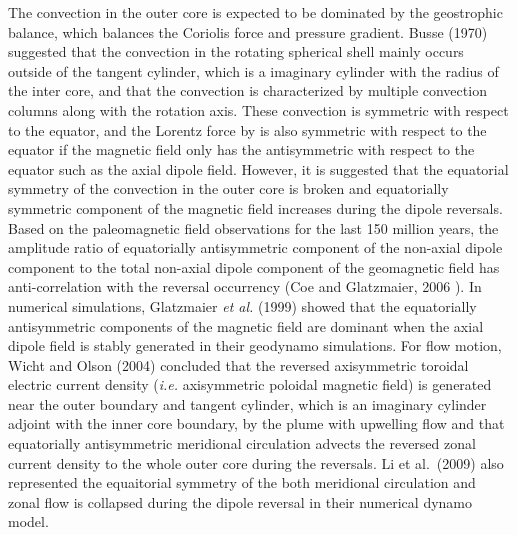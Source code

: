 The convection in the outer core is expected to be dominated by the geostrophic balance, which balances the Coriolis force and pressure gradient. 
Busse (1970) \cite{Busse:1970} suggested that the convection in the rotating spherical shell mainly occurs outside of the tangent cylinder, which is a imaginary cylinder with the radius of the inter core, and that the convection is characterized by multiple convection columns along with the rotation axis. 
These convection is symmetric with respect to the equator, and the Lorentz force by is also symmetric with respect to the equator if the magnetic field only has the antisymmetric with respect to the equator such as the axial dipole field.
However, it is suggested that the equatorial symmetry of the convection in the outer core is broken and equatorially symmetric component of the magnetic field increases during the dipole reversals. Based on the paleomagnetic field observations for the last 150 million years, the amplitude ratio of equatorially antisymmetric component of the non-axial dipole component to the total non-axial dipole component of the geomagnetic field has anti-correlation with the reversal occurrency (Coe and Glatzmaier, 2006 \cite{Coe:2006}). In numerical simulations, Glatzmaier {\it et al.} (1999) \cite{Glatzmaier:1999} showed that the equatorially antisymmetric components of the magnetic field are dominant when the axial dipole field is stably generated in their geodynamo simulations. For flow motion, Wicht and Olson (2004) \cite{Wicht:2004} concluded that the reversed axisymmetric toroidal electric current density ({\it i.e.} axisymmetric poloidal magnetic field) is generated near the outer boundary and tangent cylinder, which is an imaginary cylinder adjoint with the inner core boundary, by the plume with upwelling flow and that equatorially antisymmetric meridional circulation advects the reversed zonal current density to the whole outer core during the reversals. Li et al.\ (2009) \cite{Li:2002} also represented the equaitorial symmetry of the both meridional circulation and zonal flow is collapsed during the dipole reversal in their numerical dynamo model.


